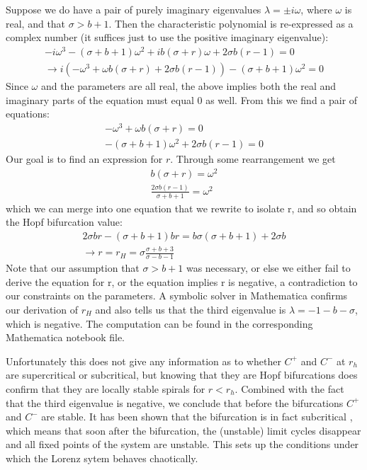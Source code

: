 \documentclass{report}
\begin{document}
Suppose we do have a pair of purely imaginary eigenvalues \(\lambda = \pm
i\omega\), where \(\omega\) is real, and that \( \sigma > b+1 \). Then the
characteristic polynomial is re-expressed as a complex number (it suffices
just to use the positive imaginary eigenvalue):
\begin{align*}
   -i\omega^3 - (\sigma + b + 1)\omega^2 + ib(\sigma + r)\omega
+ 2\sigma b(r-1) = 0 \\
   \rightarrow i(-\omega^3 +\omega b(\sigma + r) + 2\sigma b(r-1)) -
(\sigma+b+1)\omega^2 = 0
\end{align*}
Since \(\omega\) and the parameters are all real, the above implies both
the real and imaginary parts of the equation must equal 0 as well. From this
we find a pair of equations:
\begin{align*}
   -\omega^3 +\omega b(\sigma+r) = 0 \\
   -(\sigma +b+1)\omega^2 + 2\sigma b(r-1) = 0
\end{align*}
Our goal is to find an expression for \(r\). Through some rearrangement we
get
\begin{align*}
   b(\sigma+r) = \omega^2 \\
   \frac{2\sigma b(r-1)}{\sigma +b+1} = \omega^2 
\end{align*}
which we can merge into one equation that we rewrite to isolate r, and so
obtain the Hopf bifurcation value:
\begin{align*}
   2\sigma br -(\sigma +b+1)br = b\sigma(\sigma+b+1)+2\sigma b \\
   \rightarrow r = r_H = \sigma \frac{\sigma+b+3}{\sigma-b-1}
\end{align*}
Note that our assumption that \( \sigma > b+1 \) was necessary, or else we
either fail to derive the equation for r, or the equation implies r is
negative, a contradiction to our constraints on the parameters. A symbolic
solver in Mathematica confirms our derivation of \(r_H\) and also tells us
that the third eigenvalue is \(\lambda = -1-b-\sigma\), which is negative.
The computation can be found in the corresponding Mathematica notebook file.

Unfortunately this does not give any information as to whether \(C^+\) and
\(C^-\) at \(r_h\) are supercritical or subcritical, but knowing that they
are Hopf bifurcations does confirm that they are locally stable spirals for
\(r < r_h\). Combined with the fact that the third eigenvalue is negative,
we conclude that before the bifurcations \(C^+\) and \(C^-\) are stable.
It has been shown that the bifurcation is in fact subcritical\cite{strogatz15}
\cite{sparrow82}, which means that soon after the bifurcation, the (unstable)
limit cycles disappear and all fixed points of the system are unstable. This
sets up the conditions under which the Lorenz sytem behaves chaotically.
\end{document}
